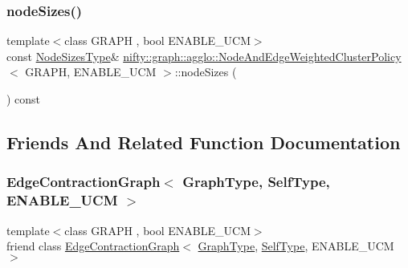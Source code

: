 \subsubsection{\texorpdfstring{node\+Sizes()}{nodeSizes()}}
{\footnotesize\ttfamily template$<$class G\+R\+A\+PH , bool E\+N\+A\+B\+L\+E\+\_\+\+U\+CM$>$ \\
const \hyperlink{classnifty_1_1graph_1_1agglo_1_1NodeAndEdgeWeightedClusterPolicy_a47dc2122410c8a113e4b14664be633c7}{Node\+Sizes\+Type}\& \hyperlink{classnifty_1_1graph_1_1agglo_1_1NodeAndEdgeWeightedClusterPolicy}{nifty\+::graph\+::agglo\+::\+Node\+And\+Edge\+Weighted\+Cluster\+Policy}$<$ G\+R\+A\+PH, E\+N\+A\+B\+L\+E\+\_\+\+U\+CM $>$\+::node\+Sizes (\begin{DoxyParamCaption}{ }\end{DoxyParamCaption}) const\hspace{0.3cm}{\ttfamily [inline]}}



\subsection{Friends And Related Function Documentation}
\mbox{\label{classnifty_1_1graph_1_1agglo_1_1NodeAndEdgeWeightedClusterPolicy_a6939aa4c6113ba9c44fd5e048687ba92}} 
\subsubsection{\texorpdfstring{Edge\+Contraction\+Graph$<$ Graph\+Type, Self\+Type, E\+N\+A\+B\+L\+E\+\_\+\+U\+C\+M $>$}{EdgeContractionGraph< GraphType, SelfType, ENABLE\_UCM >}}
{\footnotesize\ttfamily template$<$class G\+R\+A\+PH , bool E\+N\+A\+B\+L\+E\+\_\+\+U\+CM$>$ \\
friend class \hyperlink{classnifty_1_1graph_1_1EdgeContractionGraph}{Edge\+Contraction\+Graph}$<$ \hyperlink{classnifty_1_1graph_1_1agglo_1_1NodeAndEdgeWeightedClusterPolicy_a293d476ffc7b8513eeb20c21bfefb579}{Graph\+Type}, \hyperlink{classnifty_1_1graph_1_1agglo_1_1NodeAndEdgeWeightedClusterPolicy}{Self\+Type}, E\+N\+A\+B\+L\+E\+\_\+\+U\+CM $>$\hspace{0.3cm}{\ttfamily [friend]}}



